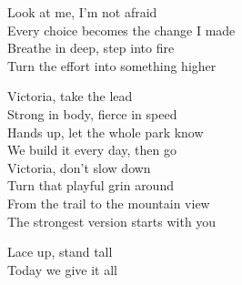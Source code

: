 \begin{lyrics}
Look at me, I’m not afraid\\
Every choice becomes the change I made\\
Breathe in deep, step into fire\\
Turn the effort into something higher

Victoria, take the lead\\
Strong in body, fierce in speed\\
Hands up, let the whole park know\\
We build it every day, then go\\
Victoria, don’t slow down\\
Turn that playful grin around\\
From the trail to the mountain view\\
The strongest version starts with you

Lace up, stand tall\\
Today we give it all
\end{lyrics}

